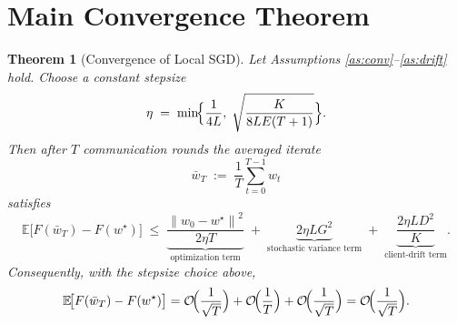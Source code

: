 \documentclass{article}
\newtheorem{theorem}{Theorem}
\newcommand{\EE}{\mathbb{E}}
\newcommand{\norm}[1]{\left\lVert#1\right\rVert}
\begin{document}
\section*{Main Convergence Theorem}
\begin{theorem}[Convergence of Local SGD]\label{thm:main}
Let Assumptions \ref{as:conv}–\ref{as:drift} hold. Choose a constant stepsize
\[
\eta \;=\; \min\!\Bigl\{\frac{1}{4L},\; \sqrt{\frac{K}{8LE(T+1)}}\Bigr\}.
\]
Then after $T$ communication rounds the averaged iterate
\[
\bar w_T\;:=\;\frac1T\sum_{t=0}^{T-1} w_t
\]
satisfies
\[
\EE\!\bigl[F(\bar w_T)-F(w^\star)\bigr]
\;\le\;
\underbrace{\frac{\norm{w_0-w^\star}^{2}}{2\eta T}}_{\text{optimization term}}
\;+\;
\underbrace{2\eta L G^2}_{\text{stochastic variance term}}
\;+\;
\underbrace{ \frac{2\eta L D^2}{K} }_{\text{client‑drift term}} .
\]
Consequently, with the stepsize choice above,
\[
\EE\!\bigl[F(\bar w_T)-F(w^\star)\bigr]=\mathcal{O}\!\Bigl(\frac{1}{\sqrt{T}}\Bigr)
+ \mathcal{O}\!\Bigl(\frac{1}{T}\Bigr)+\mathcal{O}\!\Bigl(\frac{1}{\sqrt{T}}\Bigr)
= \mathcal{O}\!\Bigl(\frac{1}{\sqrt{T}}\Bigr).
\]
\end{theorem}

\end{document}
